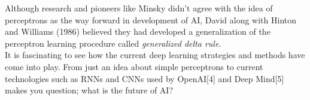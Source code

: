 \documentclass[10pt]{article}
\begin{document}
Although research and pioneers like Minsky didn’t agree with the idea of perceptrons as the way forward in development of AI, David along with Hinton and Williams (1986) believed they had developed a generalization of the perceptron learning procedure called \textit{generalized delta
rule.} \\

It is fascinating to see how the current deep learning strategies and methods have come into play. From just an idea about simple perceptrons to current technologies such as RNNs and CNNs used by OpenAI[4] and Deep Mind[5] makes you question; what is the future of AI?




 
 
\end{document}
